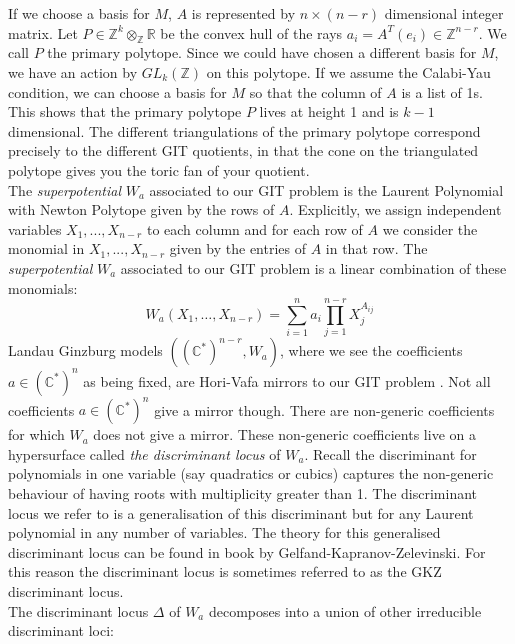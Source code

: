 \documentclass[oneside,reqno]{amsart}
\theoremstyle{definition}
\theoremstyle{definition}
\theoremstyle{definition}
\theoremstyle{definition}
\newcommand{\CC}{\mathbb{C}}
\newcommand{\Z}{\mathbb{Z}}
\newcommand{\R}{\mathbb{R}}
\begin{document}
If we choose a basis for $M$, $A$ is represented by $n\times (n-r)$ dimensional integer matrix. Let $P \in \Z^k \otimes_{\Z} \R$ be the convex hull of the rays $a_i = A^T(e_i) \in \Z^{n-r}$. We call $P$ the primary polytope. Since we could have chosen a different basis for $M$, we have an action by $GL_k(\Z)$ on this polytope. If we assume the Calabi-Yau condition, we can choose a basis for $M$ so that the column of $A$ is a list of 1s. This shows that the primary polytope $P$ lives at height 1 and  is $k-1$ dimensional.  The different triangulations of the primary polytope correspond precisely to the different GIT quotients, in that the cone on the triangulated polytope gives you the toric fan of your quotient. \\
\newline
The \textit{superpotential} $W_{a}$ associated to our GIT problem is the Laurent Polynomial with Newton Polytope given by the rows of $A$. Explicitly, we assign independent variables $X_1,...,X_{n-r}$ to each column and for each row of $A$ we consider the monomial in $X_1,...,X_{n-r}$ given by the entries of $A$ in that row. The \textit{superpotential} $W_{a}$ associated to our GIT problem is a linear combination of these monomials:
\begin{equation}
    \label{superpotential}
    W_a(X_1,\dots,X_{n-r}) = \sum_{i=1}^n a_i\prod_{j=1}^{n-r}X_j^{A_{ij}}
\end{equation}
Landau Ginzburg models $((\CC^*)^{n-r},W_a)$, where we see the coefficients $a \in (\CC^*)^{n}$ as being fixed, are Hori-Vafa mirrors to our GIT problem \cite{horivafa}. Not all coefficients $a \in (\CC^*)^{n}$ give a mirror though. There are non-generic coefficients for which $W_a$ does not give a mirror. These non-generic coefficients live on a hypersurface called \textit{the discriminant locus} of $W_a$. Recall the discriminant for polynomials in one variable (say quadratics or cubics) captures the non-generic behaviour of having roots with multiplicity greater than 1. The discriminant locus we refer to is a generalisation of this discriminant but for any Laurent polynomial in any number of variables. The theory for this generalised discriminant locus can be found in book \cite{gelfand1994discriminants} by Gelfand-Kapranov-Zelevinski. For this reason the discriminant locus is sometimes referred to as the GKZ discriminant locus. \\
\newline
The discriminant locus $\Delta$ of $W_a$ decomposes into a union of other irreducible discriminant loci:
\end{document}
